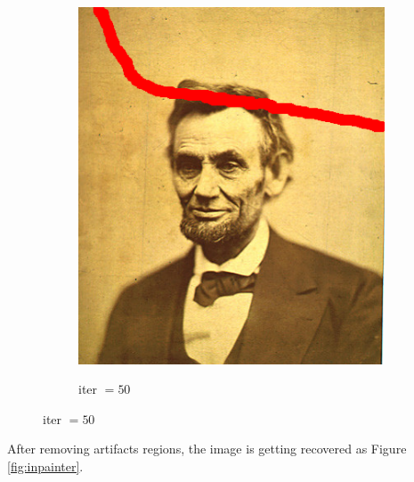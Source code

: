 \documentclass[paper=a4, fontsize=11pt]{scrartcl} %
\numberwithin{equation}{section} %
\numberwithin{figure}{section} %
\numberwithin{table}{section} %
\begin{document}
\begin{figure}[H]
\begin{subfigure}[b]{0.32\textwidth}
{		  \includegraphics[width=\textwidth]{inpainter_scrabbles.png}
		}
	\caption{iter $=50$}
	\end{subfigure}
\end{figure}

After removing artifacts regions, the image is getting recovered as Figure \ref{fig:inpainter}.
\end{document}
